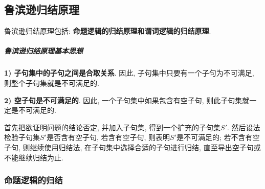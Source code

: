 \subsection{鲁滨逊归结原理}
鲁滨逊归结原理包括: \textbf{命题逻辑的归结原理和谓词逻辑的归结原理}.
\subparagraph{鲁滨逊归结原理基本思想}
\textbf{1) 子句集中的子句之间是合取关系}. 因此, 子句集中只要有一个子句为不可满足, 则整个子句集就是不可满足的.

\textbf{2) 空子句是不可满足的}. 因此, 一个子句集中如果包含有空子句, 则此子句集就一定是不可满足的.

首先把欲证明问题的结论否定, 并加入子句集, 得到一个扩充的子句集$S'$. 然后设法检验子句集$S'$是否含有空子句, 若含有空子句, 则表明$S'$是不可满足的;
若不含有空子句, 则继续使用归结法, 在子句集中选择合适的子句进行归结, 直至导出空子句或不能继续归结为止.
\subsubsection{命题逻辑的归结}~{}

